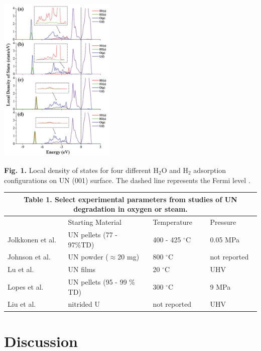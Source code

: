 \documentclass[11pt]{article}
\begin{document}
\begin{multicols}{2}
\begin{center}
	\includegraphics[height=8cm]{Bo} \\	
\end{center}
\textbf{Fig. 1.} Local density of states for four different H$_{2}$O and H$_{2}$ adsorption configurations on UN (001) surface. The dashed line represents the Fermi level \cite{Bo2016}.

\begin{table}[!t]
	
	\setlength{\extrarowheight}{1.5mm}
	\begin{tabular}{ p{3.5cm} p{5cm} p{2.5cm} p{2.5cm}  }
		
		\multicolumn{4}{c}{\textbf{Table 1.} Select experimental parameters from studies of UN degradation in oxygen or steam.} \\
		\hline
		& Starting Material &Temperature & Pressure\\
		\hline
		Jolkkonen et al. \cite{Jolkkonen2017}   &  UN pellets (77 - 97\%TD) &400 - 425 $^{\circ}$C&  0.05 MPa \\
		Johnson et al. \cite{Johnson2016}   & UN powder ($\approx$20 mg)     &800 $^{\circ}$C&  not reported \\
		Lu et al. \cite{Lu2016}  & UN films    &20 $^{\circ}$C&   UHV \\
		Lopes et al. \cite{Lopes2017}   & UN pellets (95 - 99 \% TD)    & 300 $^{\circ}$C&   9 MPa \\
		Liu et al. \cite{Liu2013}& nitrided U & not reported  & UHV\\
		\hline
	\end{tabular}
\end{table}
\section{Discussion}


\end{multicols}
\end{document}
